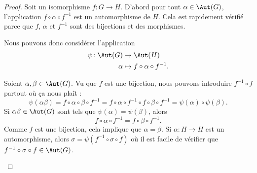\begin{proof}
	Soit un isomorphisme \( f\colon G\to H\). D'abord pour tout \( \alpha\in \Aut(G)\), l'application \( f\circ\alpha\circ f^{-1}\) est un automorphisme de \( H\). Cela est rapidement vérifié parce que \( f\), \( \alpha\) et \( f^{-1}\) sont des bijections et des morphismes.

	Nous pouvons donc considérer l'application
	\begin{equation}
		\begin{aligned}
			\psi\colon \Aut(G) & \to \Aut(H)                        \\
			\alpha             & \mapsto f\circ \alpha\circ f^{-1}.
		\end{aligned}
	\end{equation}
	\begin{subproof}
		Soient \( \alpha,\beta\in\Aut(G)\). Vu que \( f\) est une bijection, nous pouvons introduire \( f^{-1}\circ f\) partout où ça nous plaît :
		\begin{equation}
			\psi(\alpha\beta)=f\circ\alpha\circ\beta\circ f^{-1}=f\circ\alpha\circ f^{-1}\circ f\circ\beta\circ f^{-1}=\psi(\alpha)\circ\psi(\beta).
		\end{equation}
		Si \( \alpha\beta\in \Aut(G)\) sont tels que \( \psi(\alpha)=\psi(\beta)\), alors
		\begin{equation}
			f\circ\alpha\circ f^{-1}=f\circ \beta\circ f^{-1}.
		\end{equation}
		Comme \( f\) est une bijection, cela implique que \( \alpha=\beta\).
		Si \( \alpha\colon H\to H\) est un automorphisme, alors \( \sigma=\psi(f^{-1}\circ\sigma\circ f)\) où il est facile de vérifier que \( f^{-1}\circ\sigma\circ f\in\Aut(G)\).
	\end{subproof}
\end{proof}

